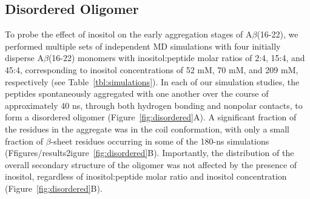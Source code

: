 


\subsection{Disordered Oligomer}

To probe the effect of inositol on the early aggregation stages of A$\beta$(16-22), we performed multiple sets of independent MD simulations with four initially disperse A$\beta$(16-22) monomers with inositol:peptide molar ratios of 2:4, 15:4, and 45:4, corresponding to inositol concentrations of 52 mM, 70 mM, and 209 mM, respectively (see Table~\ref{tbl:simulations}). In each of our simulation studies, the peptides spontaneously aggregated with one another over the course of approximately 40 ns, through both hydrogen bonding and nonpolar contacts, to form a disordered oligomer (Figure~\ref{fig:disordered}A). A significant fraction of the residues in the aggregate was in the coil conformation, with only a small fraction of $\beta$-sheet residues occurring in some of the 180-ns simulations (Ffigures/results2igure~\ref{fig:disordered}B). Importantly, the distribution of the overall secondary structure of the oligomer was not affected by the presence of inositol, regardless of inositol:peptide molar ratio and inositol concentration (Figure~\ref{fig:disordered}B).

